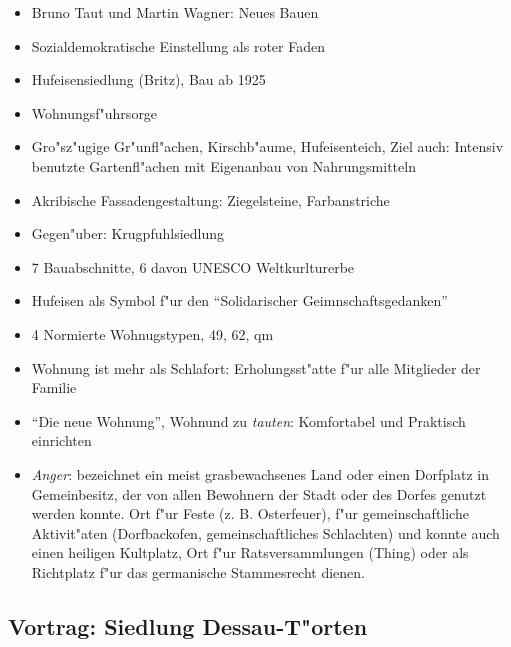 \documentclass[emulatestandardclasses]{scrartcl}
\begin{document}
\begin{itemize}
  \item Bruno Taut und Martin Wagner: Neues Bauen
  \item Sozialdemokratische Einstellung als roter Faden
  \item Hufeisensiedlung (Britz), Bau ab 1925
  \item Wohnungsf"uhrsorge
  \item Gro"sz"ugige Gr"unfl"achen, Kirschb"aume, Hufeisenteich, Ziel auch: Intensiv benutzte Gartenfl"achen mit Eigenanbau von Nahrungsmitteln
  \item Akribische Fassadengestaltung: Ziegelsteine, Farbanstriche
  \item Gegen"uber: Krugpfuhlsiedlung
  \item 7 Bauabschnitte, 6 davon UNESCO Weltkurlturerbe
  \item Hufeisen als Symbol f"ur den "`Solidarischer Geimnschaftsgedanken"'
  \item 4 Normierte Wohnugstypen, 49, 62, qm
  \item Wohnung ist mehr als Schlafort: Erholungsst"atte f"ur alle Mitglieder der Familie
  \item "`Die neue Wohnung"', Wohnund zu \emph{tauten}: Komfortabel und Praktisch einrichten
  \item \emph{Anger}: bezeichnet ein meist grasbewachsenes Land oder einen Dorfplatz in Gemeinbesitz, der von allen Bewohnern der Stadt oder des Dorfes genutzt werden konnte.  Ort f"ur Feste (z. B. Osterfeuer), f"ur gemeinschaftliche Aktivit"aten (Dorfbackofen, gemeinschaftliches Schlachten) und konnte auch einen heiligen Kultplatz, Ort f"ur Ratsversammlungen (Thing) oder als Richtplatz f"ur das germanische Stammesrecht dienen. 
\end{itemize}


\subsection{Vortrag: Siedlung Dessau-T"orten}
\end{document}
